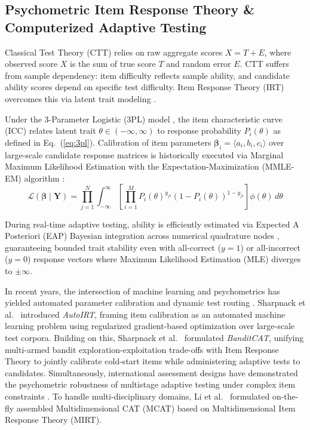 \documentclass[conference]{IEEEtran}
\begin{document}
\subsection{Psychometric Item Response Theory \& Computerized Adaptive Testing}
Classical Test Theory (CTT) relies on raw aggregate scores $X = T + E$, where observed score $X$ is the sum of true score $T$ and random error $E$. CTT suffers from sample dependency: item difficulty reflects sample ability, and candidate ability scores depend on specific test difficulty. Item Response Theory (IRT) overcomes this via latent trait modeling \cite{Lord1980,Birnbaum1968}.

Under the 3-Parameter Logistic (3PL) model \cite{Birnbaum1968,Lord1980}, the item characteristic curve (ICC) relates latent trait $\theta \in (-\infty, \infty)$ to response probability $P_i(\theta)$ as defined in Eq.~(\ref{eq:3pl}). Calibration of item parameters $\boldsymbol{\beta}_i = \langle a_i, b_i, c_i \rangle$ over large-scale candidate response matrices is historically executed via Marginal Maximum Likelihood Estimation with the Expectation-Maximization (MMLE-EM) algorithm \cite{BockAitkin1981}:
\begin{equation}
    \mathcal{L}(\boldsymbol{\beta} \mid \mathbf{Y}) = \prod_{j=1}^N \int_{-\infty}^{\infty} \left[ \prod_{i=1}^M P_i(\theta)^{y_{ji}} (1 - P_i(\theta))^{1 - y_{ji}} \right] \phi(\theta) \, d\theta
    \label{eq:mmle_em}
\end{equation}

During real-time adaptive testing, ability is efficiently estimated via Expected A Posteriori (EAP) Bayesian integration across numerical quadrature nodes \cite{BockMislevy1982}, guaranteeing bounded trait stability even with all-correct ($y = 1$) or all-incorrect ($y = 0$) response vectors where Maximum Likelihood Estimation (MLE) diverges to $\pm \infty$.

In recent years, the intersection of machine learning and psychometrics has yielded automated parameter calibration and dynamic test routing \cite{Zhuang2026}. Sharpnack et al.~\cite{Sharpnack2024} introduced \textit{AutoIRT}, framing item calibration as an automated machine learning problem using regularized gradient-based optimization over large-scale test corpora. Building on this, Sharpnack et al.~\cite{Sharpnack2025} formulated \textit{BanditCAT}, unifying multi-armed bandit exploration-exploitation trade-offs with Item Response Theory to jointly calibrate cold-start items while administering adaptive tests to candidates. Simultaneously, international assessment designs have demonstrated the psychometric robustness of multistage adaptive testing under complex item constraints \cite{Shin2025}. To handle multi-disciplinary domains, Li et al.~\cite{Li2025} formulated on-the-fly assembled Multidimensional CAT (MCAT) based on Multidimensional Item Response Theory (MIRT).
\end{document}
